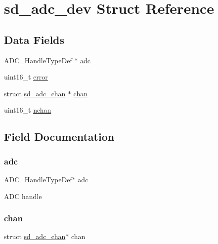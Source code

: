 \hypertarget{structsd__adc__dev}{}\section{sd\+\_\+adc\+\_\+dev Struct Reference}
\label{structsd__adc__dev}
\subsection*{Data Fields}
\begin{DoxyCompactItemize}
\item 
A\+D\+C\+\_\+\+Handle\+Type\+Def $\ast$ \mbox{\hyperlink{structsd__adc__dev_a2701c9711189aaeb5f330e1d4db94c42}{adc}}
\item 
uint16\+\_\+t \mbox{\hyperlink{structsd__adc__dev_a9585f7c65cacfde431ff801e5f68ea4b}{error}}
\item 
struct \mbox{\hyperlink{structsd__adc__chan}{sd\+\_\+adc\+\_\+chan}} $\ast$ \mbox{\hyperlink{structsd__adc__dev_a56e265e6548e44784a7dd68ac365bdc1}{chan}}
\item 
uint16\+\_\+t \mbox{\hyperlink{structsd__adc__dev_a89df740891e8c1f7060a630afead9a43}{nchan}}
\end{DoxyCompactItemize}


\subsection{Field Documentation}
\mbox{\label{structsd__adc__dev_a2701c9711189aaeb5f330e1d4db94c42}} 
\subsubsection{\texorpdfstring{adc}{adc}}
{\footnotesize\ttfamily A\+D\+C\+\_\+\+Handle\+Type\+Def$\ast$ adc}

A\+DC handle \mbox{\label{structsd__adc__dev_a56e265e6548e44784a7dd68ac365bdc1}} 
\subsubsection{\texorpdfstring{chan}{chan}}
{\footnotesize\ttfamily struct \mbox{\hyperlink{structsd__adc__chan}{sd\+\_\+adc\+\_\+chan}}$\ast$ chan}

